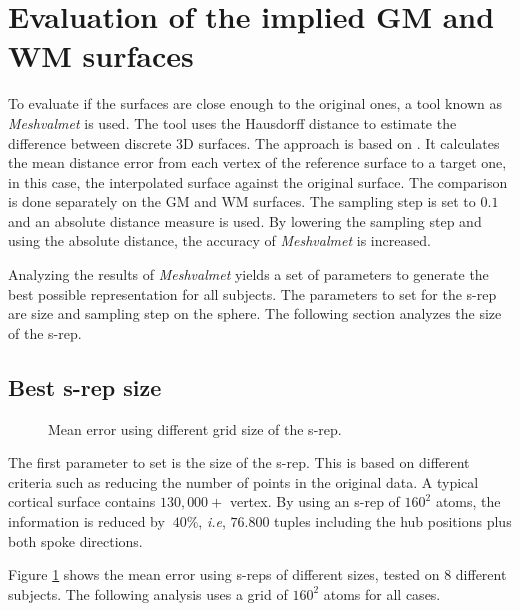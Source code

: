 \documentclass[a4paper,twoside]{article}
\begin{document}
\section{Evaluation of the implied GM and WM surfaces}
\label{sec:Evaluation}

To evaluate if the surfaces are close enough to the original ones, 
a tool known as \textit{Meshvalmet} is used.
The tool uses the Hausdorff distance to estimate the difference between discrete 3D surfaces. 
The approach is based on \cite{aspert_mesh:_2002}. It
calculates the mean distance error from each vertex of the reference surface to 
a target one, in this case, the interpolated surface against the original surface. 
The comparison is done separately on the GM and WM surfaces.
The sampling step is set to $0.1$ and an absolute distance measure is used.
By lowering the sampling step and using the 
absolute distance, the accuracy of \textit{Meshvalmet} is increased.

Analyzing the results of \textit{Meshvalmet} 
yields a set of parameters to generate the best possible representation 
for all subjects. 
The parameters to set for the s-rep are size and sampling step on the sphere.
The following section analyzes the size of the s-rep.

\subsection{Best s-rep size}
\label{sec:s-repsize}

\begin{figure}[!h]
 \centering 
 \caption[GM and WM surface mean error: grid size.]{Mean error using different grid size of the s-rep.}
 \label{fig:GridSize} 
\end{figure}

The first parameter to set is the size of the s-rep. This is based on different criteria
such as reducing the number of points in the original data. A typical cortical surface contains $130,000+$ vertex.
By using an s-rep of $160^2$ atoms, the information is reduced by $~40\%$, \textit{i.e}, 
$76.800$ tuples including the hub positions plus both spoke directions.

Figure \ref{fig:GridSize} shows the mean error using s-reps of different sizes, tested on 8 different subjects. 
The following analysis uses a grid of $160^2$ atoms for all cases.
\end{document}
